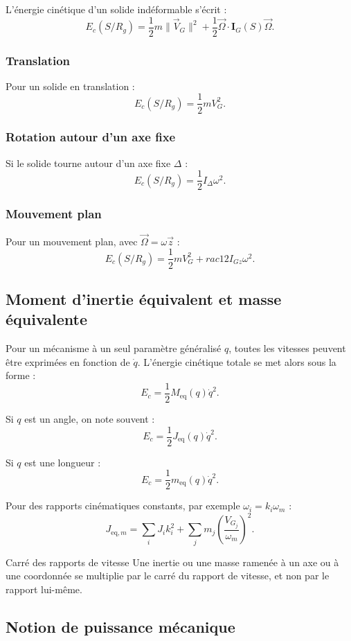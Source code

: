 L'énergie cinétique d'un solide indéformable s'écrit :
\[
E_c(S/R_g)=
\frac12 m\|\vec V_G\|^2
+\frac12\vec\Omega\cdot\mathbf I_G(S)\vec\Omega.
\]

\subsubsection{Translation}

Pour un solide en translation :
\[
E_c(S/R_g)=\frac12 mV_G^2.
\]

\subsubsection{Rotation autour d'un axe fixe}

Si le solide tourne autour d'un axe fixe $\Delta$ :
\[
E_c(S/R_g)=\frac12 I_\Delta\omega^2.
\]

\subsubsection{Mouvement plan}

Pour un mouvement plan, avec $\vec\Omega=\omega\vec z$ :
\[
E_c(S/R_g)=\frac12 mV_G^2+rac12 I_{Gz}\omega^2.
\]

\subsection{Moment d'inertie équivalent et masse équivalente}

Pour un mécanisme à un seul paramètre généralisé $q$, toutes les vitesses peuvent être exprimées en fonction de $\dot q$. L'énergie cinétique totale se met alors sous la forme :
\[
E_c=\frac12 M_{\mathrm{eq}}(q)\dot q^2.
\]

Si $q$ est un angle, on note souvent :
\[
E_c=\frac12 J_{\mathrm{eq}}(q)\dot q^2.
\]

Si $q$ est une longueur :
\[
E_c=\frac12 m_{\mathrm{eq}}(q)\dot q^2.
\]

Pour des rapports cinématiques constants, par exemple $\omega_i=k_i\omega_m$ :
\[
J_{\mathrm{eq},m}=\sum_i J_i k_i^2
+\sum_j m_j\left(\frac{V_{G_j}}{\omega_m}\right)^2.
\]

\begin{TLWarning}{Carré des rapports de vitesse}
Une inertie ou une masse ramenée à un axe ou à une coordonnée se multiplie par le carré du rapport de vitesse, et non par le rapport lui-même.
\end{TLWarning}

\subsection{Notion de puissance mécanique}

